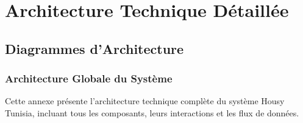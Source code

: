 
\chapter{Architecture Technique Détaillée}
\label{annexe:architecture}

\section{Diagrammes d'Architecture}

\subsection{Architecture Globale du Système}

Cette annexe présente l'architecture technique complète du système Housy Tunisia, incluant tous les composants, leurs interactions et les flux de données.

